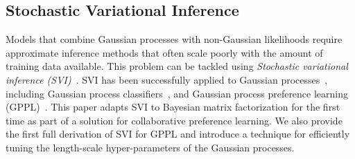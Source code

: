 \subsection{Stochastic Variational Inference}
Models that combine Gaussian processes with non-Gaussian likelihoods require approximate inference
methods that often scale poorly with the amount of training data available. 
This problem can be tackled using \emph{Stochastic variational inference (SVI)}~\citep{hoffman2013stochastic}. 
SVI has been successfully applied to Gaussian processes~\citep{hensman2013gaussian}, including Gaussian process classifiers~\citep{hensman2015scalable}, and Gaussian process preference learning (GPPL)~\citep{simpson2018finding}.
This paper adapts SVI to Bayesian matrix factorization for the first time as part of a solution for
collaborative preference learning. 
We also provide the first full derivation of SVI for GPPL
and introduce a technique for efficiently tuning the length-scale hyper-parameters of the Gaussian processes.
